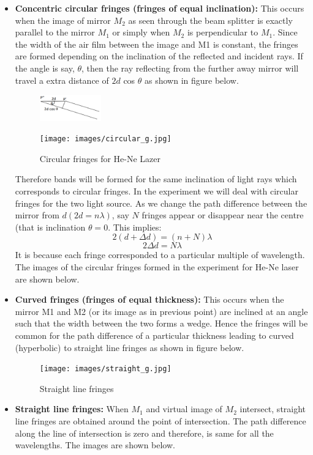 		\begin{itemize}
			\item \textbf{Concentric circular fringes (fringes of equal inclination):} This occurs when the image of mirror $M_2$ as seen through the beam splitter is exactly parallel to the mirror $M_1$ or simply when $M_2$ is perpendicular to $M_1$. Since the width of the air film between the image and M1 is constant, the fringes are formed depending on the inclination of the reflected and incident rays. If the angle is say, $\theta$, then the ray reflecting from the further away mirror will travel a extra distance of $2d$ cos $\theta$ as shown in figure below.
			\begin{figure}[H]
				\centering
				\includegraphics[width=0.25\textwidth]{images/1.png}
			\end{figure}
			\begin{figure}[H]
				\centering
				\texttt{[image: images/circular\_g.jpg]}
				\caption{Circular fringes for He-Ne Lazer}
			\end{figure}
			Therefore bands will be formed for the same inclination of light rays which corresponds to circular fringes. In the experiment we will deal with circular fringes for the two light source. As we change the path difference between the mirror from $d (2d = n\lambda)$, say $N$ fringes appear or disappear near the centre (that is inclination $\theta = 0$. This implies:
			$$2(d+\Delta d) = (n+N)\lambda$$
			\begin{equation}
				2\Delta d = N\lambda
				\label{eq:1}
			\end{equation}
			It is because each fringe corresponded to a particular multiple of wavelength. The images of the circular fringes formed in the experiment for He-Ne laser are shown below.


			\item \textbf{Curved fringes (fringes of equal thickness):} This occurs when the mirror M1 and M2 (or its image as in previous point) are inclined at an angle such that the width between the two forms a wedge. Hence the fringes will be common for the path difference of a particular thickness leading to curved (hyperbolic) to straight line fringes as shown in figure below.
			\begin{figure}[H]
				\centering
				\texttt{[image: images/straight\_g.jpg]}
				\caption{Straight line fringes}
			\end{figure}

			\item \textbf{Straight line fringes:} When $M_1$ and virtual image of $M_2$ intersect, straight line fringes are obtained around the point of intersection. The path difference along the line of intersection is zero and therefore, is same for all the wavelengths. The images are shown below.

		\end{itemize}

